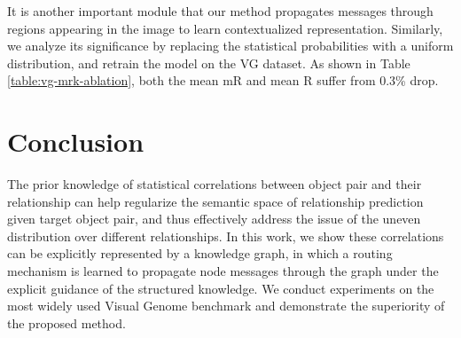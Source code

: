 \documentclass[10pt,twocolumn,letterpaper]{article}
\begin{document}
It is another important module that our method propagates messages through regions appearing in the image to learn contextualized representation. Similarly, we analyze its significance by replacing the statistical probabilities with a uniform distribution, and retrain the model on the VG dataset. As shown in Table \ref{table:vg-mrk-ablation}, both the mean mR and mean R suffer from 0.3\% drop.

\section{Conclusion}
The prior knowledge of statistical correlations between object pair and their relationship can help regularize the semantic space of relationship prediction given target object pair, and thus effectively address the issue of the uneven distribution over different relationships. In this work, we show these correlations can be explicitly represented by a knowledge graph, in which a routing mechanism is learned to propagate node messages through the graph under the explicit guidance of the structured knowledge. We conduct experiments on the most widely used Visual Genome benchmark and demonstrate the superiority of the proposed method.

{\small


}
\end{document}
